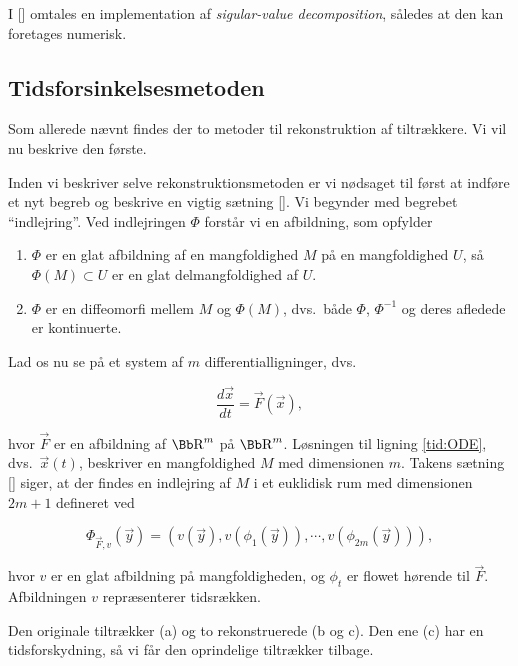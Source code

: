 I [] omtales en implementation af {\em
sigular-value decomposition}, s{\aa}ledes at den kan
foretages numerisk.

\subsection{Tidsforsinkelsesmetoden}
\label{tid:delay}
Som allerede n{\ae}vnt findes der to metoder til
rekonstruktion af tiltr{\ae}kkere. Vi vil nu beskrive den
f{\o}rste.

\vspace{4.0mm}
Inden vi beskriver selve rekonstruktionsmetoden er vi
n{\o}dsaget til f{\o}rst at indf{\o}re et nyt begreb og
beskrive en vigtig s{\ae}tning []. Vi
begynder med begrebet ``indlejring''. Ved indlejringen
$\Phi$ forst{\aa}r vi en afbildning, som opfylder

\begin{enumerate}
  \item 
    $\Phi$ er en glat afbildning af en mangfoldighed $M$ p{\aa} en
    mangfoldighed $U$, s{\aa} $\Phi(M) \subset U$ er en glat
    delmangfoldighed af $U$.
  \item
    $\Phi$ er en diffeomorfi mellem $M$ og $\Phi(M)$, dvs.\ b{\aa}de
    $\Phi$, $\Phi^{-1}$ og deres afledede er kontinuerte.
\end{enumerate} 

Lad os nu se p{\aa} et system af $m$ differentialligninger, dvs.\

\begin{equation}
  \label{tid:ODE}
  \frac{d\vec{x}}{dt} = \vec{F}(\vec{x}),
\end{equation}

hvor $\vec{F}$ er en afbildning af $\R^m$ p{\aa} $\R^m$.
L{\o}sningen til ligning \ref{tid:ODE}, dvs.\ $\vec{x}(t)$,
beskriver en mangfoldighed $M$ med dimensionen $m$. Takens
s{\ae}tning [] siger, at der findes en
indlejring af $M$ i et euklidisk rum med dimensionen $2m+1$
defineret ved

\[
  \Phi_{\vec{F},v}(\vec{y}) = (v(\vec{y}), v(\phi_1(\vec{y})),
  \cdots, v(\phi_{2m}(\vec{y}))),
\]

hvor $v$ er en glat afbildning p{\aa} mangfoldigheden, og
$\phi_t$ er flowet h{\o}rende til $\vec{F}$. Afbildningen
$v$ repr{\ae}senterer tidsr{\ae}kken.

{
\caption{\protect\capsize Den originale tiltr{\ae}kker
         (a) og to rekonstruerede (b og c). Den ene (c) har en
         tidsforskydning, s{\aa} vi f{\aa}r den oprindelige
         tiltr{\ae}kker tilbage.}
\label{tid:cirkel}
}

